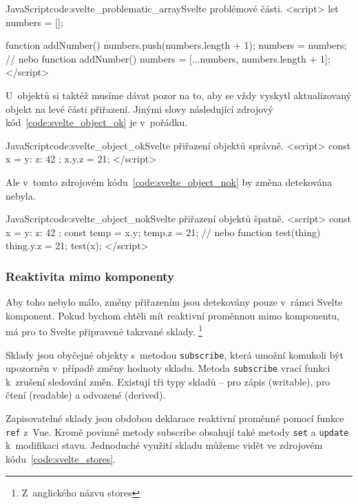 \documentclass[
  master,
  program=ainf,
  printversion,
  tables=false,
  sourcecodes,
  glossaries,
  index
]{kidiplom}
\begin{document}
  \begin{kicode}{JavaScript}{code:svelte_problematic_array}{Svelte problémové části.}
    <script>
      let numbers = [];

      function addNumber() {
        numbers.push(numbers.length + 1);
        numbers = numbers;
      }
      // nebo
      function addNumber() {
        numbers = [...numbers, numbers.length + 1];
      }
    </script>
  \end{kicode}


U~objektů si taktéž musíme dávat pozor na to, aby se vždy vyskytl aktualizovaný objekt na levé části přiřazení.
Jinými slovy následující zdrojový kód~\ref{code:svelte_object_ok} je v~pořádku.

  \begin{kicode}{JavaScript}{code:svelte_object_ok}{Svelte přiřazení objektů správně.}
    <script>
      const x = { y: { z: 42 }};
      x.y.z = 21;
    </script>
  \end{kicode}

Ale v~tomto zdrojovém kódu~\ref{code:svelte_object_nok} by změna detekována nebyla.

  \begin{kicode}{JavaScript}{code:svelte_object_nok}{Svelte přiřazení objektů špatně.}
    <script>
      const x = { y: { z: 42 }};
      const temp = x.y;
      temp.z = 21;
      // nebo
      function test(thing) {
        thing.y.z = 21;
      }
      test(x);
    </script>
  \end{kicode}


\subsubsection{Reaktivita mimo komponenty}

Aby toho nebylo málo, změny přiřazením jsou detekovány pouze v~rámci Svelte komponent. Pokud bychom
chtěli mít reaktivní proměnnou mimo komponentu, má pro to Svelte připravené takzvané sklady.
\footnote{Z~anglického názvu stores} 

Sklady jsou obyčejné objekty s~metodou {\tt subscribe}, která umožní komukoli být upozorněn v~případě změny
hodnoty skladu. Metoda {\tt subscribe} vrací funkci k~zrušení sledování změn. Existují tři typy 
skladů -- pro zápis (writable), pro čtení (readable) a odvozené (derived).

Zapisovatelné sklady jsou obdobou deklarace reaktivní proměnné pomocí funkce {\tt ref} z~Vue. Kromě povinné metody
subscribe obsahují také metody {\tt set} a {\tt update} k~modifikaci stavu. Jednoduché využití skladu můžeme vidět
ve zdrojovém kódu~\ref{code:svelte_stores}.
\end{document}
